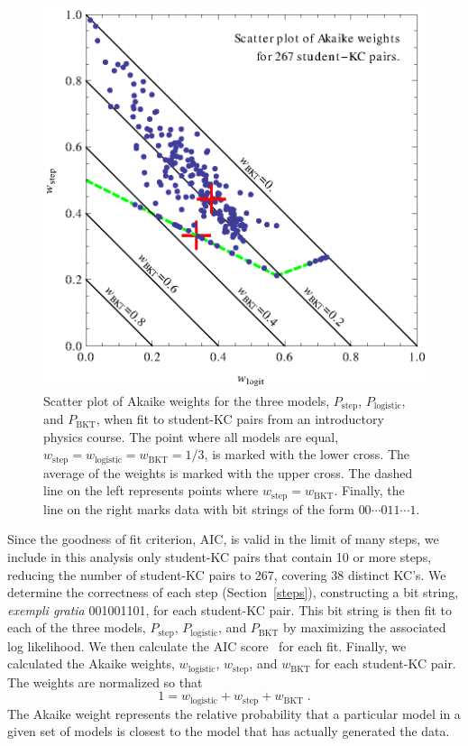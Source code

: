 \documentclass{acmlarge-edm}
\begin{document}
\begin{figure}
  \centering \includegraphics{scatter-weights.eps}
  \caption{Scatter plot of  Akaike weights for the three models, 
   $P_\mathrm{step}$, $P_\mathrm{logistic}$, and $P_\mathrm{BKT}$, 
   when fit to student-KC pairs from an introductory physics course.
   The point where all models are equal,
   $w_\mathrm{step}=w_\mathrm{logistic}=w_\mathrm{BKT}=1/3$, is
   marked with the lower cross.  
   The average of the  weights is marked with
   the upper cross.
  The dashed line on the left represents points
   where $w_\mathrm{step}=w_\mathrm{BKT}$.  Finally, the line on 
   the right marks data with bit strings of the form
   $00\cdots 011\cdots 1$.} 
   \label{scatter1}
\end{figure}

Since the goodness of fit criterion, AIC, is valid in the limit of
many steps, we include in this analysis only student-KC pairs that
contain 10 or more steps, reducing the number of student-KC pairs to
267, covering 38 distinct KC's.  We determine the correctness of each
step (Section~\ref{steps}), constructing a bit string, {\em exempli
gratia} 001001101, for each student-KC pair.  This bit string is then
fit to each of the three models, $P_\mathrm{step}$,
$P_\mathrm{logistic}$, and $P_\mathrm{BKT}$ by maximizing the
associated log likelihood.
We then calculate the AIC score~\cite{burnham_model_2002} for each fit.  
Finally, we calculated the Akaike weights, $w_\mathrm{logistic}$, $w_\mathrm{step}$, and $w_\mathrm{BKT}$ for each student-KC pair.
The weights are normalized so that
%
\begin{equation}
   1=w_\mathrm{logistic}+ w_\mathrm{step} + w_\mathrm{BKT} \; .
\end{equation}
%
The Akaike weight represents the relative probability that
a particular model in a given set of models is closest
to the model that has actually generated the data. 
\end{document}
